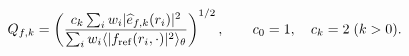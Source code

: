 \begin{equation}
Q_{f,k}=\left(\frac{c_k\sum_i w_i|\widehat e_{f,k}(r_i)|^2}
 {\sum_i w_i\langle|f_{\rm ref}(r_i,\cdot)|^2\rangle_\theta}\right)^{1/2},
 \qquad c_0=1,\quad c_k=2\;(k>0).
\label{eq:review-modal-error}
\end{equation}
